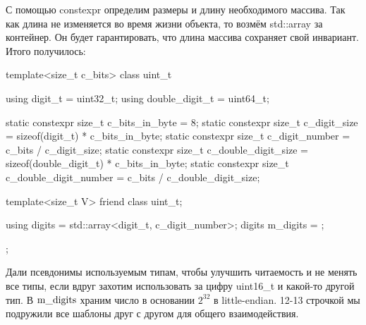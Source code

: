 С помощью constexpr определим размеры и длину необходимого массива. Так как длина не изменяется во время жизни объекта, то возмём std::array за контейнер. Он будет гарантировать, что длина массива сохраняет свой инвариант. Итого получилось:
\begin{cppcode}
template<size_t c_bits>
class uint_t {
    using digit_t = uint32_t;
    using double_digit_t = uint64_t;

    static constexpr size_t c_bits_in_byte = 8;
    static constexpr size_t c_digit_size = sizeof(digit_t) * c_bits_in_byte;
    static constexpr size_t c_digit_number = c_bits / c_digit_size;
    static constexpr size_t c_double_digit_size = sizeof(double_digit_t) * c_bits_in_byte;
    static constexpr size_t c_double_digit_number = c_bits / c_double_digit_size;

    template<size_t V>
    friend class uint_t;

    using digits = std::array<digit_t, c_digit_number>;
    digits m_digits = {};
};
\end{cppcode}
Дали псевдонимы используемым типам, чтобы улучшить читаемость и не менять все типы, если вдруг захотим использовать за цифру uint16\_t и какой-то другой тип. В $\rm m\_digits$ храним число в основании $2^{32}$ в little-endian. 12-13 строчкой мы подружили все шаблоны друг с другом для общего взаимодействия.
